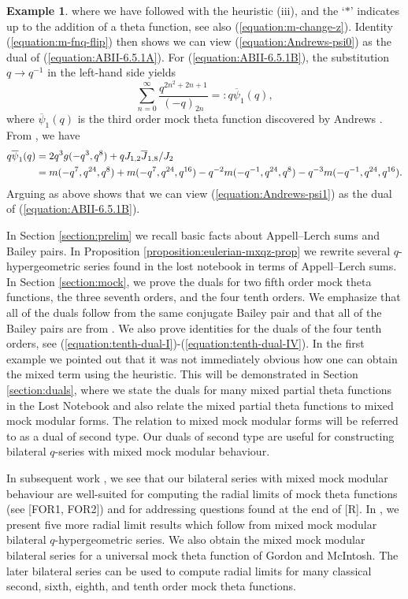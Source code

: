 \documentclass[12pt,reqno]{amsart}
\theoremstyle{remark}
\theoremstyle{definition}
\newtheorem{example}{Example}
\numberwithin{theorem}{section} \numberwithin{equation}{section}
\numberwithin{example}{section}
\begin{document}
\begin{example}
where we have followed with the heuristic (iii), and the `$*$' indicates up to the addition of a theta function, see also (\ref{equation:m-change-z}).  Identity (\ref{equation:m-fnq-flip}) then shows  we can view (\ref{equation:Andrews-psi0}) as the dual of (\ref{equation:ABII-6.5.1A}).   For (\ref{equation:ABII-6.5.1B}), the substitution $q\rightarrow q^{-1}$ in the left-hand side yields
\begin{equation}
\sum_{n=0}^{\infty}\frac{q^{2n^2+2n+1}}{(-q)_{2n}}=:q\overline{\psi}_1(q),
\end{equation}
where $\overline{\psi}_1(q)$ is the third order mock theta function discovered by Andrews \cite[$(1.15)$]{A2}.  From \cite[Theorem $1.5$]{M1}, we have
\begin{align}
q\overline{\psi}_1(q)&=2q^3g(-q^3,q^8)+q{J_{1,2}\overline{J}_{1,8}}/{J_{2}}\label{equation:Andrews-psi1}\\
&=m(-q^{7},q^{24},q^{8})+m(-q^{7},q^{24},q^{16})-q^{-2}m(-q^{-1},q^{24},q^{8}) -q^{-3}m(-q^{-1},q^{24},q^{16}).\notag
\end{align}
Arguing as above shows that we can view (\ref{equation:Andrews-psi1}) as the dual of (\ref{equation:ABII-6.5.1B}).
\end{example}

In Section \ref{section:prelim} we recall basic facts about Appell--Lerch sums and Bailey pairs.   In Proposition \ref{proposition:eulerian-mxqz-prop} we rewrite several $q$-hypergeometric series found in the lost notebook in terms of Appell--Lerch sums.  In Section \ref{section:mock}, we prove the duals for two fifth order mock theta functions, the three seventh orders, and the four tenth orders.  We emphasize that all of the duals follow from the same conjugate Bailey pair and that all of the Bailey pairs are from \cite{S, Wa1}. We also prove identities for the duals of the four tenth orders, see (\ref{equation:tenth-dual-I})-(\ref{equation:tenth-dual-IV}).   In the first example we pointed out that it was not immediately obvious how one can obtain the mixed term using the heuristic.   This will be demonstrated in Section \ref{section:duals}, where we state the duals for many mixed partial theta functions in the Lost Notebook and also relate the mixed partial theta functions to mixed mock modular forms.  The relation to mixed mock modular forms will be referred to as a dual of second type.   Our duals of second type are useful for constructing bilateral $q$-series with mixed mock modular behaviour.

In subsequent work \cite{M2}, we see that our bilateral series with mixed mock modular behaviour are well-suited for computing the radial limits of mock theta functions (see [FOR1, FOR2]) and for addressing questions found at the end of [R].  In \cite{M2}, we present five more radial limit results which follow from mixed mock modular bilateral $q$-hypergeometric series.  We also obtain the mixed mock modular bilateral series for a universal mock theta function of Gordon and McIntosh.  The later bilateral series can be used to compute radial limits for many classical second, sixth, eighth, and tenth order mock theta functions.
\end{document}
